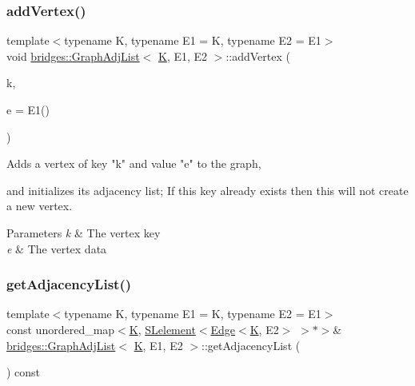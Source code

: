 \subsubsection{\texorpdfstring{addVertex()}{addVertex()}}
{\footnotesize\ttfamily template$<$typename K, typename E1 = K, typename E2 = E1$>$ \\
void \mbox{\hyperlink{classbridges_1_1_graph_adj_list}{bridges\+::\+Graph\+Adj\+List}}$<$ \mbox{\hyperlink{namespacebridges_acfb0a4f7877d8f63de3e6862004c50edaa5f3c6a11b03839d46af9fb43c97c188}{K}}, E1, E2 $>$\+::add\+Vertex (\begin{DoxyParamCaption}\item[{const \mbox{\hyperlink{namespacebridges_acfb0a4f7877d8f63de3e6862004c50edaa5f3c6a11b03839d46af9fb43c97c188}{K}} \&}]{k,  }\item[{const E1 \&}]{e = {\ttfamily E1()} }\end{DoxyParamCaption})\hspace{0.3cm}{\ttfamily [inline]}}

\begin{DoxyVerb}Adds a vertex of key "k" and value "e" to the graph,
\end{DoxyVerb}
 and initializes its adjacency list; If this key already exists then this will not create a new vertex.


\begin{DoxyParams}{Parameters}
{\em k} & The vertex key \\
\hline
{\em e} & The vertex data \\
\hline
\end{DoxyParams}
\mbox{\label{classbridges_1_1_graph_adj_list_ac26efd5d2e57a8b8881c57e515e80bcf}} 
\subsubsection{\texorpdfstring{getAdjacencyList()}{getAdjacencyList()}\hspace{0.1cm}{\footnotesize\ttfamily [1/3]}}
{\footnotesize\ttfamily template$<$typename K, typename E1 = K, typename E2 = E1$>$ \\
const unordered\+\_\+map$<$\mbox{\hyperlink{namespacebridges_acfb0a4f7877d8f63de3e6862004c50edaa5f3c6a11b03839d46af9fb43c97c188}{K}}, \mbox{\hyperlink{classbridges_1_1_s_lelement}{S\+Lelement}}$<$\mbox{\hyperlink{classbridges_1_1_edge}{Edge}}$<$\mbox{\hyperlink{namespacebridges_acfb0a4f7877d8f63de3e6862004c50edaa5f3c6a11b03839d46af9fb43c97c188}{K}}, E2$>$ $>$$\ast$$>$\& \mbox{\hyperlink{classbridges_1_1_graph_adj_list}{bridges\+::\+Graph\+Adj\+List}}$<$ \mbox{\hyperlink{namespacebridges_acfb0a4f7877d8f63de3e6862004c50edaa5f3c6a11b03839d46af9fb43c97c188}{K}}, E1, E2 $>$\+::get\+Adjacency\+List (\begin{DoxyParamCaption}{ }\end{DoxyParamCaption}) const\hspace{0.3cm}{\ttfamily [inline]}}

